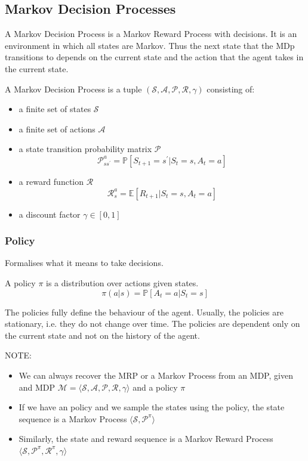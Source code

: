 \subsection{Markov Decision Processes}
A Markov Decision Process is a Markov Reward Process with decisions.
It is an environment in which all states are Markov. Thus the next state
that the MDp transitions to depends on the current state and the action
that the agent takes in the current state.

\begin{definition}
    A Markov Decision Process is a tuple \((\mathcal{S}, \mathcal{A} , \mathcal{P} , \mathcal{R} , \gamma)\)
    consisting of:
    \begin{itemize}
        \item a finite set of states \(\mathcal{S} \)
        \item a finite set of actions \(\mathcal{A} \)
        \item a state transition probability matrix \(\mathcal{P} \)
        \[
            \mathcal{P} _{ss^{\prime}}^{a} = \mathbb{P}  [S_{t+1} = s^{\prime} | S_{t} = s, A_{t} = a]  
        \]
        \item a reward function \(\mathcal{R} \)
        \[
            \mathcal{R} _{s}^{a} = \mathbb{E}  [R_{t+1} | S_{t} = s, A_{t} = a]  
        \]
        \item a discount factor \(\gamma \in [0, 1]\)
    \end{itemize}
\end{definition}
\subsubsection{Policy}
Formalises what it means to take decisions. 
\begin{definition}[Policy]
    A policy \(\pi \) is a distribution over actions given states.
    \[
        \pi (a|s) = \mathbb{P}  [A_{t} = a | S_{t} = s]  
    \]
\end{definition}
The policies fully define the behaviour of the agent. Usually,
the policies are stationary, i.e. they do not change over time.
The policies are dependent only on the current state and not on the
history of the agent.

NOTE: 
\begin{itemize}
    \item We can always recover the MRP or a Markov Process from an MDP, given
    and MDP \(\mathcal{M} = \langle \mathcal{S}, \mathcal{A} , 
    \mathcal{P} , \mathcal{R} , \gamma \rangle
    \)
    and a policy \(\pi\)
    \item If we have an policy and we sample the states using the policy,
    the state sequence is a Markov Process \( \langle \mathcal{S}, \mathcal{P} ^{\pi} \rangle \)
    
    \item Similarly, the state and reward sequence is a Markov Reward Process \( 
        \langle \mathcal{S}, \mathcal{P} ^{\pi}, \mathcal{R} ^{\pi}, \gamma \rangle \) 
\end{itemize}

